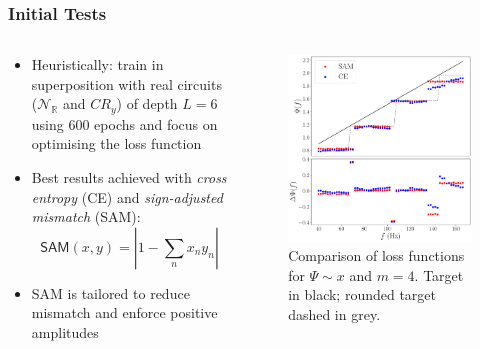 \documentclass{beamer}
\begin{document}
\begin{frame}
\frametitle{Initial Tests}
\begin{columns}
\begin{column}{0.5\textwidth}
\begin{itemize}
\item \alert{Heuristically}: train in superposition with real circuits ($\mathcal{N}_\mathbb{R}$ and $CR_y$) of depth $L =6$ using 600 epochs and \alert{focus} on optimising the \alert{loss function}
\item Best results achieved with \emph{cross entropy} (\alert{CE}) and \emph{sign-adjusted mismatch} (\alert{SAM}):
\begin{equation}
\mathsf{SAM}(x,y) = \left\vert 1 - \sum_n x_n y_n \right \vert 
\end{equation}
\item SAM is tailored to reduce mismatch and enforce positive amplitudes
\end{itemize}
\end{column}
\begin{column}{0.5\textwidth}
\begin{figure}[h]
\centering
\includegraphics[width=\textwidth]{im/phase_loss_comp_linear_m4}
\caption{Comparison of loss functions for $\Psi \sim x$ and $m=4$. Target in black; rounded target dashed in grey.}
\end{figure}
\end{column}
\end{columns}
\end{frame}
\end{document}
